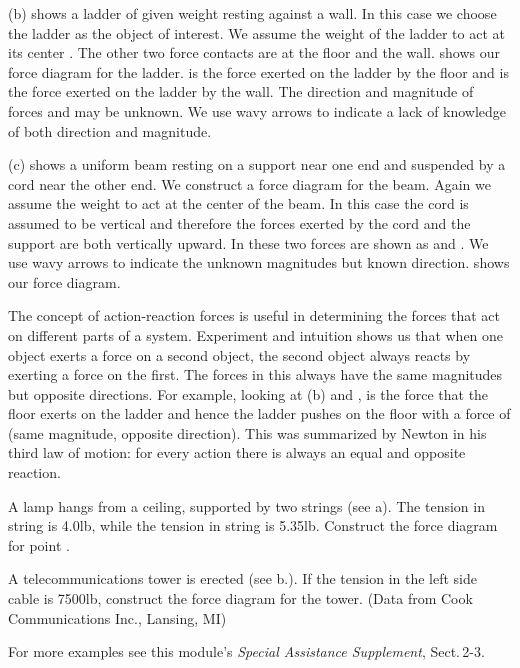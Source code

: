 {
(b) shows a ladder of given weight  resting against a wall.
In this case we choose the ladder as the object of interest.
We assume the weight of the ladder to act at its center .
% 
%
The other two force contacts are at the floor and the wall.
 shows our force diagram for the ladder.
 is the force exerted on the ladder by the floor and  is
the force exerted on the ladder by the wall.
The direction and magnitude of forces  and  may be unknown.
We use wavy arrows to indicate a lack of knowledge of both direction
and magnitude.


(c) shows a uniform beam resting on a support near one end and
suspended by a cord near the other end.
We construct a force diagram for the beam.
Again we assume the weight to act at the center of the beam.
In this case the cord is assumed to be vertical and therefore the forces
exerted by the cord and the support are both vertically upward.
In  these two forces are shown as  and .
We use wavy arrows to indicate the unknown magnitudes but known direction.
 shows our force diagram.


The concept of action-reaction forces is useful in determining the forces
that act on different parts of a system.
Experiment and intuition shows us that when one object exerts a force on a
second object, the second object always reacts by exerting a force on the
first.
The forces in this  always have the same magnitudes but opposite
directions.
For example, looking at (b) and ,  is the force that the
floor exerts on the ladder and hence the ladder pushes on the floor with a
force of  (same magnitude, opposite direction).
This was summarized by Newton in his third law of motion: for every
action there is always an equal and opposite reaction.

\tryit A lamp hangs from a ceiling, supported by two strings (see a).
The tension in string  is 4.0\unit{lb}, while the tension in string  is
5.35\unit{lb}.
Construct the force diagram for point .

\tryit A telecommunications tower is erected (see b.).
If the tension in the left side cable is 7500\unit{lb}, construct the force
diagram for the tower.
(Data from Cook Communications Inc., Lansing, MI)

\tryit For more examples see this module's \textit{Special Assistance
Supplement}, Sect.\,2-3.

}%
